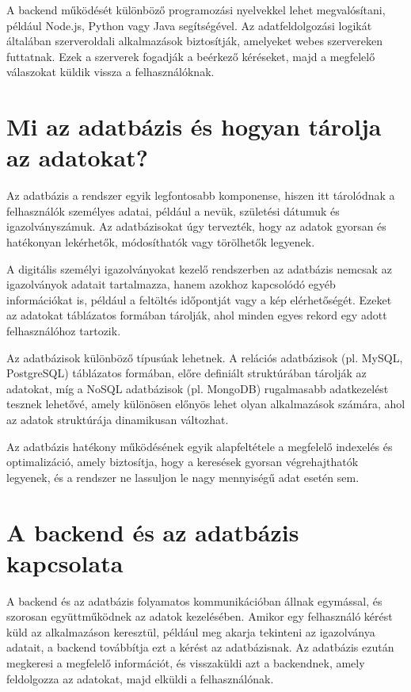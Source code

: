 \documentclass[
]{thesis-ekf}
\theoremstyle{definition}
\theoremstyle{remark}
\begin{document}
	A backend működését különböző programozási nyelvekkel lehet megvalósítani, például Node.js, Python vagy Java segítségével. Az adatfeldolgozási logikát általában szerveroldali alkalmazások biztosítják, amelyeket webes szervereken futtatnak. Ezek a szerverek fogadják a beérkező kéréseket, majd a megfelelő válaszokat küldik vissza a felhasználóknak.
	
	\section{Mi az adatbázis és hogyan tárolja az adatokat?}
	Az adatbázis a rendszer egyik legfontosabb komponense, hiszen itt tárolódnak a felhasználók személyes adatai, például a nevük, születési dátumuk és igazolványszámuk. Az adatbázisokat úgy tervezték, hogy az adatok gyorsan és hatékonyan lekérhetők, módosíthatók vagy törölhetők legyenek.
	
	A digitális személyi igazolványokat kezelő rendszerben az adatbázis nemcsak az igazolványok adatait tartalmazza, hanem azokhoz kapcsolódó egyéb információkat is, például a feltöltés időpontját vagy a kép elérhetőségét. Ezeket az adatokat táblázatos formában tárolják, ahol minden egyes rekord egy adott felhasználóhoz tartozik.
	
	Az adatbázisok különböző típusúak lehetnek. A relációs adatbázisok (pl. MySQL, PostgreSQL) táblázatos formában, előre definiált struktúrában tárolják az adatokat, míg a NoSQL adatbázisok (pl. MongoDB) rugalmasabb adatkezelést tesznek lehetővé, amely különösen előnyös lehet olyan alkalmazások számára, ahol az adatok struktúrája dinamikusan változhat.
	
	Az adatbázis hatékony működésének egyik alapfeltétele a megfelelő indexelés és optimalizáció, amely biztosítja, hogy a keresések gyorsan végrehajthatók legyenek, és a rendszer ne lassuljon le nagy mennyiségű adat esetén sem.
	\section{A backend és az adatbázis kapcsolata}
	A backend és az adatbázis folyamatos kommunikációban állnak egymással, és szorosan együttműködnek az adatok kezelésében. Amikor egy felhasználó kérést küld az alkalmazáson keresztül, például meg akarja tekinteni az igazolványa adatait, a backend továbbítja ezt a kérést az adatbázisnak. Az adatbázis ezután megkeresi a megfelelő információt, és visszaküldi azt a backendnek, amely feldolgozza az adatokat, majd elküldi a felhasználónak.
	
\end{document}
